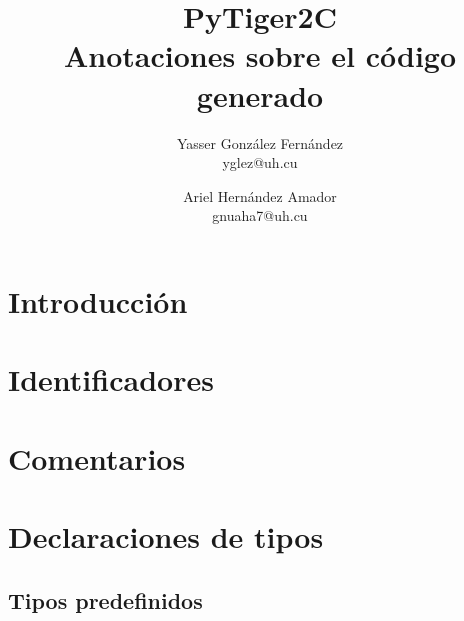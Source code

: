 \documentclass{article}
\title{
    \LARGE{PyTiger2C} \\
    \Large{Anotaciones sobre el código generado}
}
\author{
    Yasser González Fernández \\
    \small{yglez@uh.cu}
    \and
    Ariel Hernández Amador \\
    \small{gnuaha7@uh.cu}
}
\date{}
\begin{document}
\maketitle

\thispagestyle{empty}

\newpage

\setcounter{page}{1}

\section{Introducción}


\section{Identificadores}


\section{Comentarios}


\section{Declaraciones de tipos}


\subsection{Tipos predefinidos}



\begin{quote}

\end{quote}
\end{document}
